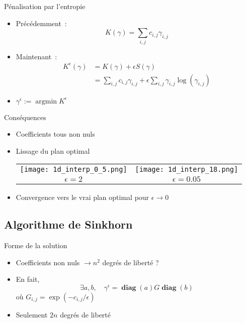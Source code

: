 \documentclass{beamer}
\DeclareMathOperator*{\argmin}{argmin}
\DeclareMathOperator{\diag}{\mathbf{diag}}
\begin{document}
\begin{frame}{Pénalisation par l'entropie}
\begin{itemize}
\item Précédemment~:
\[K(\gamma) = \sum_{i,j} c_{i,j} \gamma_{i,j} \]
\pause
\item Maintenant~:
\begin{equation*}\label{eq:keps}
\begin{split}
K^\epsilon (\gamma) 
 &= K(\gamma) + \epsilon S(\gamma) \\
&= \sum_{i,j} c_{i,j} \gamma_{i,j} + \epsilon \sum_{i,j} \gamma_{i,j} \log(\gamma_{i,j}) 
\end{split}\end{equation*}
\item $\gamma^\epsilon := \argmin K^\epsilon $
\end{itemize}
\end{frame}

\begin{frame}{Conséquences}
\begin{itemize}
\item Coefficients tous non nuls
\item Lissage du plan optimal
\begin{tabular}{c c}
\texttt{[image: 1d\_interp\_0\_5.png]} & 
\texttt{[image: 1d\_interp\_18.png]} \\
$\epsilon = 2$ & $\epsilon = 0.05$
\end{tabular}
\item Convergence vers le \og vrai \fg plan optimal pour $\epsilon \rightarrow 0$
\end{itemize}
\end{frame}



\subsection{Algorithme de Sinkhorn}

\begin{frame}{Forme de la solution}
\begin{itemize}
\item Coefficients non nuls $\rightarrow n^2$ degrés de liberté ?
\item En fait,
\[\exists a,b, \quad \gamma^\epsilon = \diag(a) G \diag(b) \]
où $G_{i,j} = \exp(-c_{i,j}/\epsilon)$
\item Seulement $2n$ degrés de liberté
\end{itemize}
\end{frame}
\end{document}
